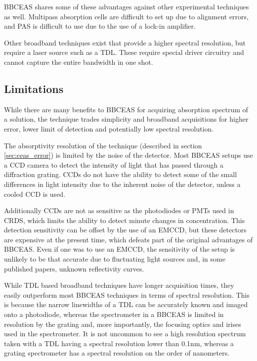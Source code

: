 \ac{BBCEAS} shares some of these advantages against other experimental
techniques as well. Multipass absorption cells are difficult to set up due to
alignment errors, and \ac{PAS} is difficult to use due to the use of a lock-in
amplifier.

Other broadband techniques exist that provide a higher spectral
resolution, but require a laser source such as a \acl{TDL}. These require
special driver circuitry and cannot capture the entire bandwidth in one shot.

\subsection{Limitations}

While there are many benefits to \ac{BBCEAS} for acquiring absorption spectrum
of a solution, the technique trades simplicity and broadband acquisitions for
higher error, lower limit of detection and potentially low spectral
resolution.

The absorptivity resolution of the technique (described in section
\ref{sec:ceas_error}) is limited by the noise of the detector. Most
\ac{BBCEAS} setups use a \ac{CCD} camera to detect the intensity of light that
has passed through a diffraction grating. \acp{CCD} do not have the ability to
detect some of the small differences in light intensity due to the inherent
noise of the detector, unless a cooled \ac{CCD} is used.

Additionally \acp{CCD} are not as sensitive as the photodiodes or \acp{PMT}
used in \ac{CRDS}, which limits the ability to detect minute changes in
concentration. This detection sensitivity can be offset by the use of an
\ac{EMCCD}, but these detectors are expensive at the present time, which
defeats part of the original advantages of \ac{BBCEAS}. Even if one was to use
an \ac{EMCCD}, the sensitivity of the setup is unlikely to be that accurate
due to fluctuating light sources and, in some published papers, unknown
reflectivity curves.

While \ac{TDL} based broadband techniques have longer acquisition
times, they easily outperform most \ac{BBCEAS} techniques in terms of spectral
resolution. This is because the narrow linewidths of a \ac{TDL} can be
accurately known and imaged onto a photodiode, whereas the spectrometer in a
\ac{BBCEAS} is limited in resolution by the grating and, more importantly, the
focusing optics and irises used in the spectrometer. It is not uncommon to see
a high resolution spectrum taken with a \ac{TDL} having a spectral resolution
lower than 0.1nm, whereas a grating spectrometer has a spectral resolution on
the order of nanometers.

